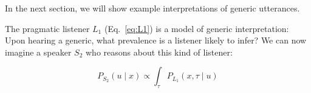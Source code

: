 \documentclass[12pt,letterpaper]{article}
\newcommand{\denote}[1]{\mbox{ $[\![ #1 ]\!]$}}
\begin{document}
%
%
%
%
%
In the next section, we will show example interpretations of generic utterances.

The pragmatic listener $L_1$ (Eq.~\ref{eq:L1}) is a model of generic interpretation: Upon hearing a generic, what prevalence is a listener likely to infer?
We can now imagine a speaker $S_2$ who reasons about this kind of listener: 

\begin{equation} 
P_{S_{2}}(u \mid x) \propto  \int_{\tau} P_{L_{1}}(x , \tau \mid u) %
\label{eq:S2}
\end{equation}
\end{document}
